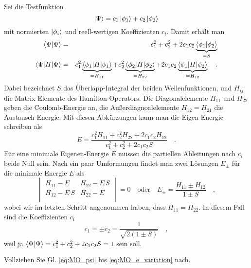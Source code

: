 Sei die Testfunktion
\begin{equation}
 \ket{\Psi} = c_1 \ket{\phi_1} + c_2 \ket{\phi_2} \label{eq:MO_psi}
\end{equation}
mit normierten  $\ket{\phi_i}$ und reell-wertigen Koeffizienten $c_i$. Damit erhält man
\begin{eqnarray}
\braket{\Psi | \Psi}  &= & c_1^2 + c_2^2  + 2 c_1 c_2 \underbrace{\braket{\phi_1 | \phi_2}}_{= S}\\
\braket{\Psi |  H | \Psi} &=& c_1^2 \underbrace{\braket{\phi_1 |  H | \phi_1 }}_{= H_{11}} +
										c_2^2 \underbrace{\braket{\phi_2 |  H | \phi_2 }}_{= H_{22}} +
								2 c_1 c_2 \underbrace{\braket{\phi_1 |  H | \phi_2 }}_{= H_{12}}  \quad .
\end{eqnarray}
Dabei bezeichnet $S$ das Überlapp-Integral der beiden Wellenfunktionen, und $H_{ij}$ die Matrix-Elemente des Hamilton-Operators. Die Diagonalelemente $H_{11}$ und $H_{22}$ geben die Coulomb-Energie an, die Außerdiagnoalelemente $H_{12} = H_{21}$ die Austausch-Energie. Mit diesen Abkürzungen kann man die Eigen-Energie schreiben als
\begin{equation}
  E = \frac{c_1^2 H_{11} + c_2^2 H_{22} + 2 c_1 c_2 H_{12}}{c_1^2 + c_2^2 + 2 c_1 c_2 S}  \quad . \label{eq:MO_e_variation}
\end{equation}
Für eine minimale Eigenen-Energie $E$ müssen die partiellen Ableitungen nach $c_i$ beide Null sein. Nach ein paar Umformungen findet man zwei Lösungen $E_\pm$ für die minimale Energie $E$ als
\begin{equation}
 \begin{vmatrix}
   H_{11} - E & H_{12} - E \, S \\  H_{12} - E \, S & H_{22} - E \\
 \end{vmatrix}
= 0
\quad
\text{oder} \quad
E_\pm = \frac{H_{11} \pm H_{12}}{1 \pm S} \quad ,
\end{equation}
wobei wir im letzten Schritt angenommen haben, dass $H_{11} = H_{22}$. In diesem Fall sind die Koeffizienten $c_i$
\begin{equation}
c_1 = \pm c_2 = \frac{1}{\sqrt{2 (1 \pm S)}} \quad ,
\end{equation}
weil  ja ${\braket{\Psi | \Psi}}  = c_1^2 + c_2^2 + 2 c_1 c_2 S = 1$ sein soll.

\begin{questions} 
\item Vollziehen Sie Gl. \ref{eq:MO_psi} bis \ref{eq:MO_e_variation} nach.
\end{questions}

